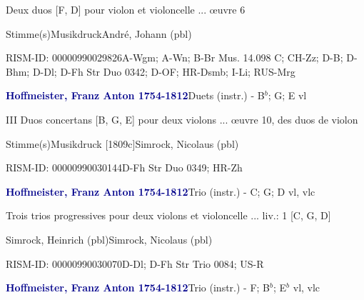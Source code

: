 \documentclass[twocolumn, 12pt]{book}
\begin{document}
\par \begin{itshape}Deux duos [F, D] pour violon et violoncelle ... œuvre 6\end{itshape} 
\par \textcolor{darkblue}{}  Stimme(s)\newline Musikdruck\newline André, Johann  (pbl)
\par RISM-ID: 00000990029826\newline A-Wgm; A-Wn; B-Br  Mus. 14.098 C; CH-Zz; D-B; D-Bhm; D-Dl; D-Fh  Str Duo 0342; D-OF; HR-Dsmb; I-Li; RUS-Mrg
\par \vspace{16pt} \textcolor{darkblue}{\textbf{Hoffmeister, Franz Anton  1754-1812}}\hfillplus{\textbf{[289]}}\newline Duets (instr.) - B$^b$; G; E vl
\par \begin{itshape}III Duos concertans [B, G, E] pour deux violons ... œuvre 10, des duos de violon\end{itshape} 
\par \textcolor{darkblue}{}  Stimme(s)\newline Musikdruck  [1809c]\newline Simrock, Nicolaus  (pbl)
\par RISM-ID: 00000990030144\newline D-Fh  Str Duo 0349; HR-Zh
\par \vspace{16pt} \textcolor{darkblue}{\textbf{Hoffmeister, Franz Anton  1754-1812}}\hfillplus{\textbf{[290]}}\newline Trio (instr.) - C; G; D vl, vlc
\par \begin{itshape}Trois trios progressives pour deux violons et violoncelle ... liv.: 1 [C, G, D]\end{itshape} \newline Simrock, Heinrich  (pbl)\newline Simrock, Nicolaus  (pbl)
\par RISM-ID: 00000990030070\newline D-Dl; D-Fh  Str Trio 0084; US-R
\par \vspace{16pt} \textcolor{darkblue}{\textbf{Hoffmeister, Franz Anton  1754-1812}}\hfillplus{\textbf{[291]}}\newline Trio (instr.) - F; B$^b$; E$^b$ vl, vlc
\end{document}
